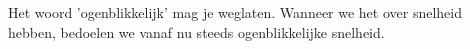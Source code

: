 \documentclass{ximera}
\begin{document}









\begin{remark}
	Het woord 'ogenblikkelijk' mag je weglaten. Wanneer we het over snelheid hebben, bedoelen we vanaf nu steeds ogenblikkelijke snelheid.
\end{remark}
\end{document}
